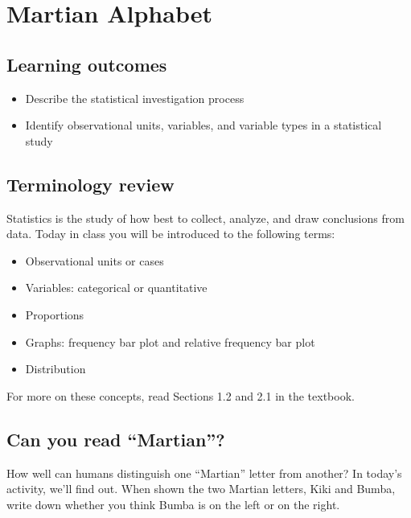 \documentclass[
]{report}
\begin{document}
\hypertarget{martian-alphabet}{%
\chapter{Martian Alphabet}\label{martian-alphabet}}

\hypertarget{learning-outcomes}{%
\section{Learning outcomes}\label{learning-outcomes}}

\begin{itemize}
\item
  Describe the statistical investigation process
\item
  Identify observational units, variables, and variable types in a statistical study
\end{itemize}

\hypertarget{terminology-review}{%
\section{Terminology review}\label{terminology-review}}

Statistics is the study of how best to collect, analyze, and draw conclusions from data. Today in class you will be introduced to the following terms:

\begin{itemize}
\item
  Observational units or cases
\item
  Variables: categorical or quantitative
\item
  Proportions
\item
  Graphs: frequency bar plot and relative frequency bar plot
\item
  Distribution
\end{itemize}

For more on these concepts, read Sections 1.2 and 2.1 in the textbook.

\hypertarget{can-you-read-martian}{%
\section{Can you read ``Martian''?}\label{can-you-read-martian}}

How well can humans distinguish one ``Martian'' letter from another? In today's activity, we'll find out. When shown the two Martian letters, Kiki and Bumba, write down whether you think Bumba is on the left or on the right.
\end{document}
